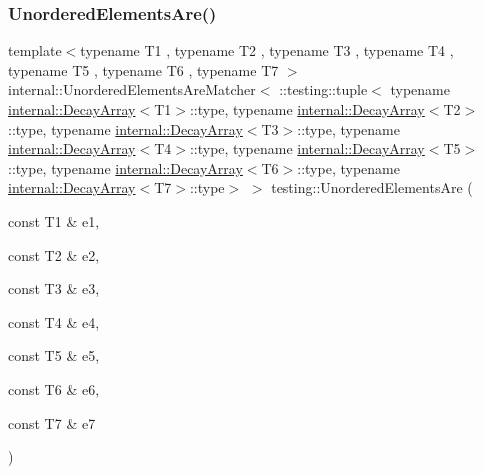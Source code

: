 \subsubsection{\texorpdfstring{UnorderedElementsAre()}{UnorderedElementsAre()}\hspace{0.1cm}{\footnotesize\ttfamily [8/11]}}
{\footnotesize\ttfamily template$<$typename T1 , typename T2 , typename T3 , typename T4 , typename T5 , typename T6 , typename T7 $>$ \\
internal\+::\+Unordered\+Elements\+Are\+Matcher$<$ \+::testing\+::tuple$<$ typename \mbox{\hyperlink{structtesting_1_1internal_1_1_decay_array}{internal\+::\+Decay\+Array}}$<$T1$>$\+::type, typename \mbox{\hyperlink{structtesting_1_1internal_1_1_decay_array}{internal\+::\+Decay\+Array}}$<$T2$>$\+::type, typename \mbox{\hyperlink{structtesting_1_1internal_1_1_decay_array}{internal\+::\+Decay\+Array}}$<$T3$>$\+::type, typename \mbox{\hyperlink{structtesting_1_1internal_1_1_decay_array}{internal\+::\+Decay\+Array}}$<$T4$>$\+::type, typename \mbox{\hyperlink{structtesting_1_1internal_1_1_decay_array}{internal\+::\+Decay\+Array}}$<$T5$>$\+::type, typename \mbox{\hyperlink{structtesting_1_1internal_1_1_decay_array}{internal\+::\+Decay\+Array}}$<$T6$>$\+::type, typename \mbox{\hyperlink{structtesting_1_1internal_1_1_decay_array}{internal\+::\+Decay\+Array}}$<$T7$>$\+::type$>$ $>$ testing\+::\+Unordered\+Elements\+Are (\begin{DoxyParamCaption}\item[{const T1 \&}]{e1,  }\item[{const T2 \&}]{e2,  }\item[{const T3 \&}]{e3,  }\item[{const T4 \&}]{e4,  }\item[{const T5 \&}]{e5,  }\item[{const T6 \&}]{e6,  }\item[{const T7 \&}]{e7 }\end{DoxyParamCaption})\hspace{0.3cm}{\ttfamily [inline]}}

\mbox{\label{namespacetesting_a0f30358234947d21c7f39f15a8395d04}} 
